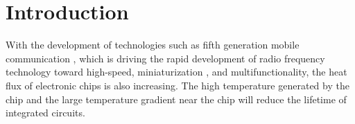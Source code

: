%
% 
%

\section{Introduction}


With the development of technologies such as fifth generation mobile communication \cite{Lau_2022}, which is driving the rapid development of radio frequency technology toward high-speed, miniaturization \cite{Matsuzawa_2002,Miao.Jin.ea_2013}, and multifunctionality, the heat flux of electronic chips is also increasing.
\Nomenclature
The high temperature generated by the chip and the large temperature gradient near the chip will reduce the lifetime of integrated circuits.